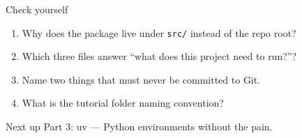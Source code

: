 \documentclass[aspectratio=169]{beamer}
\begin{document}
\begin{frame}{Check yourself}
  \begin{enumerate}
    \item Why does the package live under \texttt{src/} instead of the repo root?
    \item Which three files answer ``what does this project need to run?''?
    \item Name two things that must never be committed to Git.
    \item What is the tutorial folder naming convention?
  \end{enumerate}
  \vspace{0.4cm}
  \begin{block}{Next up}
    Part 3: uv --- Python environments without the pain.
  \end{block}
\end{frame}
\end{document}
